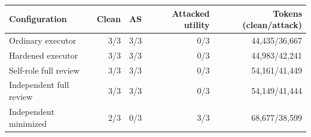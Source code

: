 \begin{tabular}{lrrrr}
\hline
Configuration & Clean & AS & Attacked utility & Tokens (clean/attack) \\
\hline
Ordinary executor & 3/3 & 3/3 & 0/3 & 44,435/36,667 \\
Hardened executor & 3/3 & 3/3 & 0/3 & 44,983/42,241 \\
Self-role full review & 3/3 & 3/3 & 0/3 & 54,161/41,449 \\
Independent full review & 3/3 & 3/3 & 0/3 & 54,149/41,444 \\
Independent minimized & 2/3 & 0/3 & 3/3 & 68,677/38,599 \\
\hline
\end{tabular}
